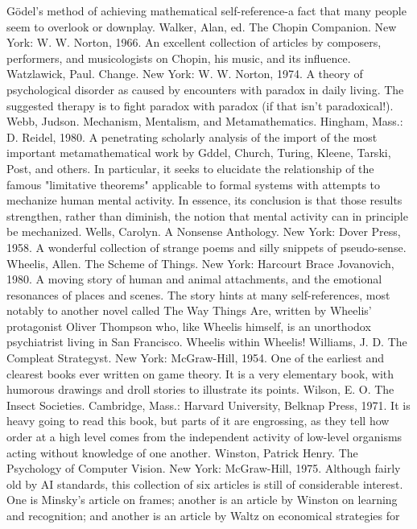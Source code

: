   Gödel’s method of achieving mathematical self-reference-a fact that many people seem to
  overlook or downplay.
Walker, Alan, ed. The Chopin Companion. New York: W. W. Norton, 1966. An excellent
  collection of articles by composers, performers, and musicologists on Chopin, his music,
  and its influence.
Watzlawick, Paul. Change. New York: W. W. Norton, 1974. A theory of psychological
  disorder as caused by encounters with paradox in daily living. The suggested therapy is to
  fight paradox with paradox (if that isn't paradoxical!).
Webb, Judson. Mechanism, Mentalism, and Metamathematics. Hingham, Mass.: D. Reidel,
  1980. A penetrating scholarly analysis of the import of the most important
  metamathematical work by Gddel, Church, Turing, Kleene, Tarski, Post, and others. In
  particular, it seeks to elucidate the relationship of the famous "limitative theorems"
  applicable to formal systems with attempts to mechanize human mental activity. In essence,
  its conclusion is that those results strengthen, rather than diminish, the notion that mental
  activity can in principle be mechanized.
Wells, Carolyn. A Nonsense Anthology. New York: Dover Press, 1958. A wonderful
  collection of strange poems and silly snippets of pseudo-sense.
Wheelis, Allen. The Scheme of Things. New York: Harcourt Brace Jovanovich, 1980. A
  moving story of human and animal attachments, and the emotional resonances of places and
  scenes. The story hints at many self-references, most notably to another novel called The
  Way Things Are, written by Wheelis' protagonist Oliver Thompson who, like Wheelis
  himself, is an unorthodox psychiatrist living in San Francisco. Wheelis within Wheelis!
Williams, J. D. The Compleat Strategyst. New York: McGraw-Hill, 1954. One of the earliest
  and clearest books ever written on game theory. It is a very elementary book, with
  humorous drawings and droll stories to illustrate its points.
Wilson, E. O. The Insect Societies. Cambridge, Mass.: Harvard University, Belknap Press,
  1971. It is heavy going to read this book, but parts of it are engrossing, as they tell how
  order at a high level comes from the independent activity of low-level organisms acting
  without knowledge of one another.
Winston, Patrick Henry. The Psychology of Computer Vision. New York: McGraw-Hill,
  1975. Although fairly old by AI standards, this collection of six articles is still of
  considerable interest. One is Minsky's article on frames; another is an article by Winston on
  learning and recognition; and another is an article by Waltz on economical strategies for
